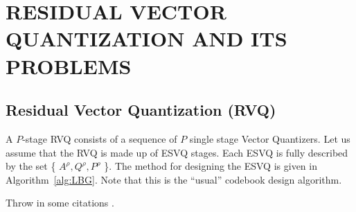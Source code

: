 %
%
%
%

\chapter{RESIDUAL VECTOR QUANTIZATION AND ITS PROBLEMS}

\section{Residual Vector Quantization (RVQ)}

A $P$-stage RVQ consists of a sequence of $P$ single stage Vector
Quantizers.  Let us assume that the RVQ is made up of ESVQ stages.
Each ESVQ is fully described by the set \{ $A^{\rho}, Q^{\rho},
P^{\rho}$ \}.  The method for designing the ESVQ is given in
Algorithm~\ref{alg:LBG}.  Note that this is the ``usual'' codebook
design algorithm.%


Throw in some citations \cite{shucker,tbrady,moon,bar1}.


